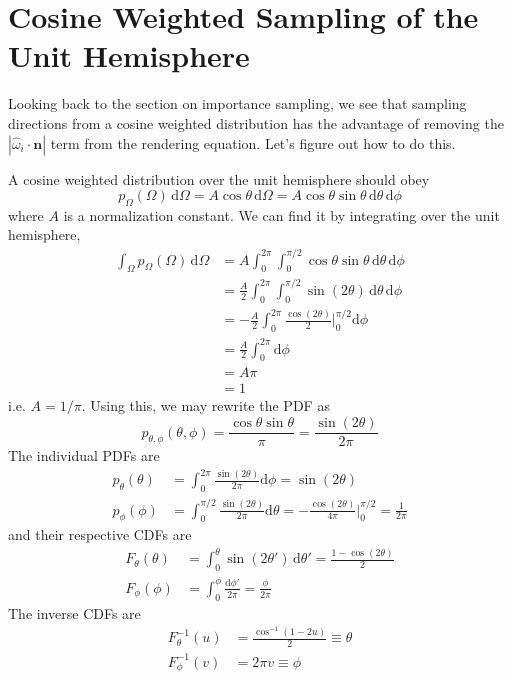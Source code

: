 \documentclass{article}
\begin{document}
\section*{Cosine Weighted Sampling of the Unit Hemisphere}

Looking back to the section on importance sampling, we see that sampling directions from a cosine weighted distribution has the advantage of removing the $|\hat{\omega}_i\cdot\mathbf{n}|$ term from the rendering equation. Let's figure out how to do this.

A cosine weighted distribution over the unit hemisphere should obey
\[
	p_{\Omega}(\Omega)\,\mathrm{d}\Omega = A\cos\theta\,\mathrm{d}\Omega = A\cos\theta\sin\theta\,\mathrm{d}\theta\,\mathrm{d}\phi
\]
where $A$ is a normalization constant. We can find it by integrating over the unit hemisphere,
\begin{align*}
	\int_{\Omega}p_{\Omega}(\Omega)\,\mathrm{d}\Omega &= A\int_0^{2\pi}\int_0^{\pi/2}\cos\theta\sin\theta\,\mathrm{d}\theta\,\mathrm{d}\phi \\
	&= \frac{A}{2}\int_0^{2\pi}\int_0^{\pi/2}\sin(2\theta)\,\mathrm{d}\theta\,\mathrm{d}\phi \\
	&= {-\frac{A}{2}}\int_0^{2\pi}\frac{\cos(2\theta)}{2}\Big|_0^{\pi/2}\mathrm{d}\phi \\
	&= \frac{A}{2}\int_0^{2\pi}\mathrm{d}\phi \\
	&= A\pi \\
	&= 1
\end{align*}
i.e. $A = 1/\pi$. Using this, we may rewrite the PDF as
\[
	p_{\theta,\phi}(\theta,\phi) = \frac{\cos\theta\sin\theta}{\pi} = \frac{\sin(2\theta)}{2\pi}
\]
The individual PDFs are
\begin{align*}
	p_{\theta}(\theta) &= \int_0^{2\pi}\frac{\sin(2\theta)}{2\pi}\mathrm{d}\phi = \sin(2\theta) \\
	p_{\phi}(\phi) &= \int_0^{\pi/2}\frac{\sin(2\theta)}{2\pi}\mathrm{d}\theta = -\frac{\cos(2\theta)}{4\pi}\Big|_0^{\pi/2} = \frac{1}{2\pi}
\end{align*}
and their respective CDFs are
\begin{align*}
	F_\theta(\theta) &= \int_0^\theta\sin(2\theta')\,\mathrm{d}\theta' = \frac{1 - \cos(2\theta)}{2} \\
	F_\phi(\phi) &= \int_0^\phi\frac{\mathrm{d}\phi'}{2\pi} = \frac{\phi}{2\pi}
\end{align*}
The inverse CDFs are
\begin{align*}
	F_\theta^{-1}(u) &= \frac{\cos^{-1}(1 - 2u)}{2} \equiv \theta \\
	F_\phi^{-1}(v) &= 2\pi{v} \equiv \phi
\end{align*}
\end{document}
